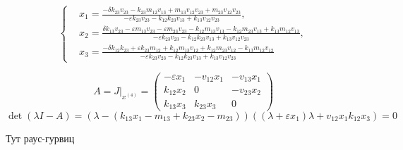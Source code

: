 \begin{enumerate}
            \[
                \left\{\begin{split}
                    & x_1 = \frac{-\delta k_{23} v_{23} - k_{23} m_{12} v_{13} + m_{13} v_{12} v_{23} + m_{23} v_{12} v_{23}}{-\varepsilon k_{23} v_{23} - k_{12} k_{23} v_{13} + k_{13} v_{12} v_{23}}, \\
                    & x_2 = \frac{\delta k_{13} v_{23} - \varepsilon m_{13} v_{23} - \varepsilon m_{23} v_{23} - k_{12} m_{13} v_{13} - k_{12} m_{23} v_{13} + k_{13} m_{12} v_{13}}{-\varepsilon k_{23} v_{23} - k_{12} k_{23} v_{13} + k_{13} v_{12} v_{23}}, \\
                    & x_3 = \frac{-\delta k_{12} k_{23} + \varepsilon k_{23} m_{12} + k_{12} m_{13} v_{12} + k_{12} m_{23} v_{12} - k_{13} m_{12} v_{12}}{-\varepsilon k_{23} v_{23} - k_{12} k_{23} v_{13} + k_{13} v_{12} v_{23}}
                \end{split}\right.
            \]

            \[
                A = J\big|_{x^{(4)}} = \left(
                    \begin{matrix}
                        -\varepsilon x_1 & -v_{12}  x_1  & -v_{13} x_1 \\
                        k_{12} x_2 & 0 & -v_{23} x_2 \\
                        k_{13} x_3 & k_{23} x_3 & 0

                    \end{matrix}
                \right)
            \]
            \[
                \det(\lambda I - A) = \left( \lambda - \left( k_{13} x_1 - m_{13} + k_{23} x_2 - m_{23} \right) \right) \left( (\lambda + \varepsilon x_1)\lambda + v_{12} x_1 k_{12} x_3 \right) = 0
            \]

            Тут раус-гурвиц


    \end{enumerate}